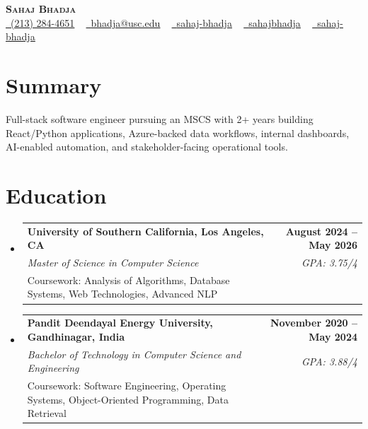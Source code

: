 \documentclass[letterpaper,10pt]{article}
\makeatletter
\newcommand{\resumeEduSubheading}[5]{\vspace{-1pt}\item\begin{tabular*}{1.0\textwidth}[t]{l@{\extracolsep{\fill}}r}\textbf{#1} & \textbf{\small #2} \\\textit{\small #3} & \textit{\small #4} \\\small #5 & \\\end{tabular*}\vspace{-4pt}}
\newcommand{\resumeSubHeadingListStart}{\begin{itemize}[leftmargin=0.0in, label={}]}
\newcommand{\resumeSubHeadingListEnd}{\end{itemize}}
\makeatother
\begin{document}
\begin{center}
{\Huge \scshape \textbf{Sahaj Bhadja}} \\ \vspace{1pt}
\small \href{tel:(213) 284-4651}{\faPhone\ \underline{(213) 284-4651}} ~ \href{mailto: bhadja@usc.edu}{\raisebox{-0.2\height}\faEnvelope\ \underline{bhadja@usc.edu}} ~
\href{https://www.linkedin.com/in/sahaj-bhadja/}{\raisebox{-0.2\height}\faLinkedin\ \underline{sahaj-bhadja}} ~ \href{https://github.com/SAHAJ-BHADJA}{\raisebox{-0.2\height}\faGithub\ \underline{sahajbhadja}} ~
\href{https://sahaj-bhadja.vercel.app/}{\raisebox{-0.2\height}\faGlobe\ \underline{sahaj-bhadja}}
\end{center}
\vspace{-16pt}
\section{Summary}
\begin{itemize}[leftmargin=0.15in, label={}]
\small{\item{Full-stack software engineer pursuing an MSCS with 2+ years building React/Python applications, Azure-backed data workflows, internal dashboards, AI-enabled automation, and stakeholder-facing operational tools.}}
\end{itemize}
\vspace{-6pt}
\section{Education}
\resumeSubHeadingListStart
\resumeEduSubheading{University of Southern California, Los Angeles, CA}{August 2024 -- May 2026}{Master of Science in Computer Science}{GPA: 3.75/4}{Coursework: Analysis of Algorithms, Database Systems, Web Technologies, Advanced NLP}
\vspace{-9pt}
\resumeEduSubheading{Pandit Deendayal Energy University, Gandhinagar, India}{November 2020 -- May 2024}{Bachelor of Technology in Computer Science and Engineering}{GPA: 3.88/4}{Coursework: Software Engineering, Operating Systems, Object-Oriented Programming, Data Retrieval}
\resumeSubHeadingListEnd
\vspace{-6pt}
\end{document}
